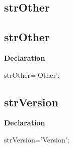 \documentclass{report}
\newif\ifpdf
\begin{document}
\subsection*{\large{\textbf{strOther}}\normalsize\hspace{1ex}\hrulefill}
\else
\subsection*{strOther}
\fi
\label{trstrings-strOther}
\begin{list}{}{
\setlength{\itemindent}{0cm}
\setlength{\listparindent}{0cm}
\setlength{\leftmargin}{\evensidemargin}
\addtolength{\leftmargin}{\tmplength}
\settowidth{\labelsep}{X}
\addtolength{\leftmargin}{\labelsep}
\setlength{\labelwidth}{\tmplength}
}
\item[\textbf{Declaration}\hfill]
\ifpdf
\begin{flushleft}
\fi
\begin{ttfamily}
strOther='Other';\end{ttfamily}

\ifpdf
\end{flushleft}
\fi

\end{list}
\ifpdf
\subsection*{\large{\textbf{strVersion}}\normalsize\hspace{1ex}\hrulefill}
\else
\subsection*{strVersion}
\fi
\label{trstrings-strVersion}
\begin{list}{}{
\setlength{\itemindent}{0cm}
\setlength{\listparindent}{0cm}
\setlength{\leftmargin}{\evensidemargin}
\addtolength{\leftmargin}{\tmplength}
\settowidth{\labelsep}{X}
\addtolength{\leftmargin}{\labelsep}
\setlength{\labelwidth}{\tmplength}
}
\item[\textbf{Declaration}\hfill]
\ifpdf
\begin{flushleft}
\fi
\begin{ttfamily}
strVersion='Version';\end{ttfamily}

\ifpdf
\end{flushleft}
\fi

\end{list}
\ifpdf
\end{document}

